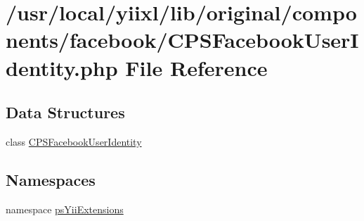 \hypertarget{CPSFacebookUserIdentity_8php}{
\section{/usr/local/yiixl/lib/original/components/facebook/CPSFacebookUserIdentity.php File Reference}
\label{CPSFacebookUserIdentity_8php}
}
\subsection*{Data Structures}
\begin{DoxyCompactItemize}
\item 
class \hyperlink{classCPSFacebookUserIdentity}{CPSFacebookUserIdentity}
\end{DoxyCompactItemize}
\subsection*{Namespaces}
\begin{DoxyCompactItemize}
\item 
namespace \hyperlink{namespacepsYiiExtensions}{psYiiExtensions}
\end{DoxyCompactItemize}
